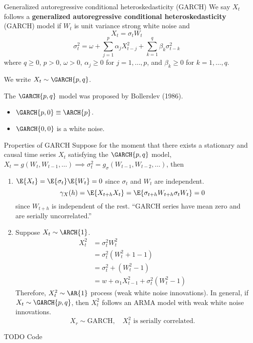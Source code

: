 \begin{Definition}{Generalized autoregressive conditional heteroskedasticity (GARCH)}{}
    We say $ X_t $ follows a \textbf{generalized autoregressive conditional heteroskedasticity}
    (GARCH) model
    if $ W_t $ is unit variance strong white noise and
    \[ X_t=\sigma_t W_t \]
    \[ \sigma_t^2=\omega+\sum_{j=1}^{p} \alpha_j X_{t-j}^2+\sum_{k=1}^{q} \beta_k \sigma_{t-k}^2 \]
    where $ q\ge 0 $, $ p>0 $, $ \omega>0 $, $ \alpha_j\ge 0 $ for $ j=1,\ldots,p $, and
    $ \beta_k\ge 0 $ for $ k=1,\ldots,q $.

    We write $ X_t \sim \GARCH{p,q} $.
\end{Definition}
\begin{Remark}{}{}
    The $ \GARCH{p,q} $ model was proposed by Bollerslev (1986).
\end{Remark}
\begin{Remark}{}{}
    \begin{itemize}
        \item $ \GARCH{p,0}\equiv \ARCH{p} $.
        \item $ \GARCH{0,0} $ is a white noise.
    \end{itemize}
\end{Remark}
\begin{Proposition}{Properties of GARCH}{}
    Suppose for the moment that there exists a stationary and causal time
    series $ X_t $ satisfying the $ \GARCH{p,q} $ model,
    $ X_t=g(W_t,W_{t-1},\ldots)\implies \sigma_t^2=g_\sigma(W_{t-1},W_{t-2},\ldots) $,
    then
    \begin{enumerate}
        \item $ \E{X_t}=\E{\sigma_t}\E{W_t}=0 $ since $ \sigma_t $ and $ W_t $ are
              independent.
              \[ \gamma_X(h)=\E{X_{t+h}X_t}=\E{\sigma_{t+h}W_{t+h}\sigma_tW_t}=0 \]
              since $ W_{t+h} $ is independent of the rest.
              ``GARCH series have mean zero and are serially uncorrelated.''
        \item Suppose $ X_t \sim \ARCH{1} $.
              \begin{align*}
                  X_t^2
                   & =\sigma_t^2 W_{t}^2                        \\
                   & =\sigma_t^2(W_t^2+1-1)                     \\
                   & =\sigma_t^2+(W_t^2-1)                      \\
                   & =w+\alpha_1 X_{t-1}^2 +\sigma_t^2(W_t^2-1)
              \end{align*}
              Therefore, $ X_t^2 \sim \AR{1} $ process (weak white noise innovations).
              In general, if $ X_t \sim \GARCH{p,q} $, then $ X_t^2 $
              follows an ARMA model with weak white noise innovations.
              \[ X_r \sim \text{GARCH},\quad X_t^2\text{ is serially correlated.} \]
    \end{enumerate}
\end{Proposition}
TODO Code

